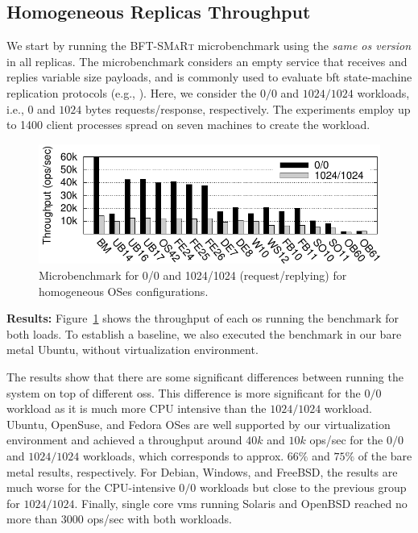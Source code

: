 


\subsection{Homogeneous Replicas Throughput}

We start by running the \textsc{BFT-SMaRt} microbenchmark using the \emph{same \gls{os} version} in all replicas.
The microbenchmark considers an empty service that receives and replies variable size payloads, and is commonly used to evaluate \gls{bft} state-machine replication protocols (e.g., \cite{Castro:1999,Bessani:2014,Liu:2016,Behl:2015,Behl:2017}). 
Here, we consider the $0/0$ and $1024/1024$ workloads, i.e., $0$ and $1024$ bytes requests/response, respectively.
The experiments employ up to 1400 client processes spread on seven machines to create the workload.

\begin{figure}[t]
\begin{center}
\includegraphics[width=\columnwidth]{images/gnuplot/vagrant/runs_new_new/throughput.pdf}
\caption{Microbenchmark for 0/0 and 1024/1024 (request/replying) for homogeneous OSes configurations.}
\label{fig:bftsmart}
\end{center}
\end{figure}


\textbf{Results:}
Figure~\ref{fig:bftsmart} shows the throughput of each \gls{os} running the benchmark for both loads.
To establish a baseline, we also executed the benchmark in our bare metal Ubuntu, without \system virtualization environment.

The results show that there are some significant differences between running the system on top of different \glspl{os}.
This difference is more significant for the $0/0$ workload as it is much more CPU intensive than the $1024/1024$ workload.
Ubuntu, OpenSuse, and Fedora OSes are well supported by our virtualization environment and achieved a throughput around $40k$ and $10k$ ops/sec for the $0/0$ and $1024/1024$ workloads, which corresponds to approx. $66\%$ and $75\%$ of the bare metal results, respectively.
For Debian, Windows, and FreeBSD, the results are much worse for the CPU-intensive $0/0$ workloads but close to the previous group for $1024/1024$.
Finally, single core \glspl{vm} running Solaris and OpenBSD reached no more than $3000$ ops/sec with both workloads.


